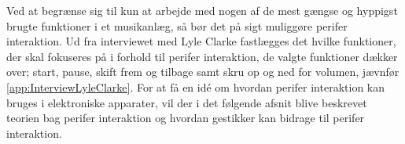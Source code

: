 Ved at begrænse sig til kun at arbejde med nogen af de mest gængse og hyppigst brugte funktioner i et musikanlæg, så bør det på sigt muliggøre perifer interaktion. Ud fra interviewet med Lyle Clarke fastlægges det hvilke funktioner, der skal fokuseres på i forhold til perifer interaktion, de valgte funktioner dækker over; start, pause, skift frem og tilbage samt skru op og ned for volumen, jævnfør \autoref{app:InterviewLyleClarke}.\blankline
%
For at få en idé om hvordan perifer interaktion kan bruges i elektroniske apparater, vil der i det følgende afsnit blive beskrevet teorien bag perifer interaktion og hvordan gestikker kan bidrage til perifer interaktion. 

